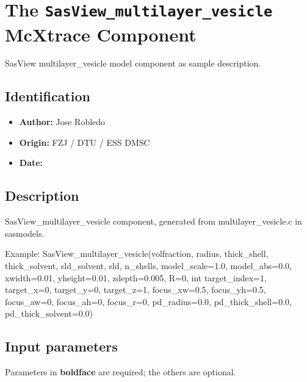 \section{The \texttt{SasView\_multilayer\_vesicle} McXtrace Component}
SasView multilayer\_vesicle model component as sample description.

\subsection*{Identification}
\begin{itemize}
  \item \textbf{Author:} Jose Robledo
  \item \textbf{Origin:} FZJ / DTU / ESS DMSC
  \item \textbf{Date:} 
\end{itemize}

\subsection*{Description}
SasView\_multilayer\_vesicle component, generated from multilayer\_vesicle.c in sasmodels.

Example: SasView\_multilayer\_vesicle(volfraction, radius, thick\_shell, thick\_solvent, sld\_solvent, sld, n\_shells, model\_scale=1.0, model\_abs=0.0, xwidth=0.01, yheight=0.01, zdepth=0.005, R=0, int target\_index=1, target\_x=0, target\_y=0, target\_z=1, focus\_xw=0.5, focus\_yh=0.5, focus\_aw=0, focus\_ah=0, focus\_r=0, pd\_radius=0.0, pd\_thick\_shell=0.0, pd\_thick\_solvent=0.0)

\subsection*{Input parameters}
Parameters in \textbf{boldface} are required; the others are optional.

